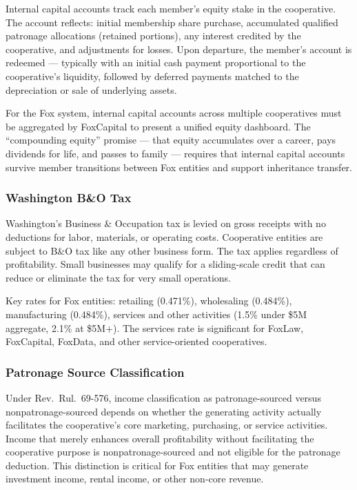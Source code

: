 \documentclass[11pt,letterpaper]{article}
\begin{document}
Internal capital accounts track each member's equity stake in the cooperative. The account reflects: initial membership share purchase, accumulated qualified patronage allocations (retained portions), any interest credited by the cooperative, and adjustments for losses. Upon departure, the member's account is redeemed --- typically with an initial cash payment proportional to the cooperative's liquidity, followed by deferred payments matched to the depreciation or sale of underlying assets.

For the Fox system, internal capital accounts across multiple cooperatives must be aggregated by FoxCapital to present a unified equity dashboard. The ``compounding equity'' promise --- that equity accumulates over a career, pays dividends for life, and passes to family --- requires that internal capital accounts survive member transitions between Fox entities and support inheritance transfer.

\subsubsection{Washington B\&O Tax}

Washington's Business \& Occupation tax is levied on gross receipts with no deductions for labor, materials, or operating costs. Cooperative entities are subject to B\&O tax like any other business form. The tax applies regardless of profitability. Small businesses may qualify for a sliding-scale credit that can reduce or eliminate the tax for very small operations.

Key rates for Fox entities: retailing (0.471\%), wholesaling (0.484\%), manufacturing (0.484\%), services and other activities (1.5\% under \$5M aggregate, 2.1\% at \$5M+). The services rate is significant for FoxLaw, FoxCapital, FoxData, and other service-oriented cooperatives.

\subsubsection{Patronage Source Classification}

Under Rev.\ Rul.\ 69-576, income classification as patronage-sourced versus nonpatronage-sourced depends on whether the generating activity actually facilitates the cooperative's core marketing, purchasing, or service activities. Income that merely enhances overall profitability without facilitating the cooperative purpose is nonpatronage-sourced and not eligible for the patronage deduction. This distinction is critical for Fox entities that may generate investment income, rental income, or other non-core revenue.
\end{document}

